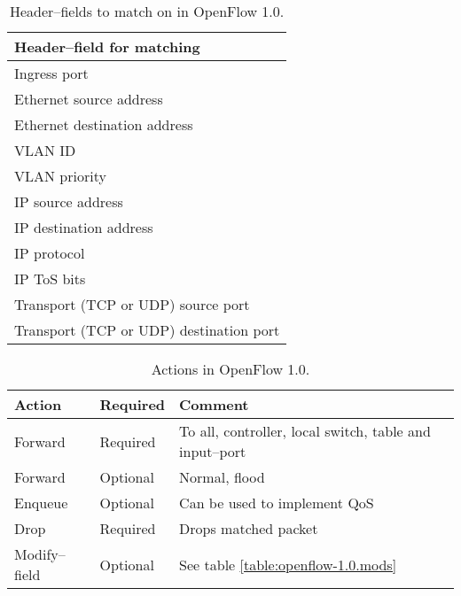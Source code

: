 \begin{table}
\centering
  \begin{tabular}{|l|}
    \hline \textbf{Header--field for matching} \\
    \hline Ingress port \\
    \hline Ethernet source address \\
    \hline Ethernet destination address \\
    \hline VLAN ID \\
    \hline VLAN priority \\
    \hline IP source address \\
    \hline IP destination address \\
    \hline IP protocol \\
    \hline IP \ac{ToS} bits \\
    \hline Transport (TCP or UDP) source port \\
    \hline Transport (TCP or UDP) destination port \\
    \hline
  \end{tabular}
  \caption{Header--fields to match on in OpenFlow 1.0.}
  \label{table:openflow-1.0.headers}
\end{table}

\begin{table}
\centering
  \begin{tabular}{|l|l|l|}
    \hline \textbf{Action} &
           \textbf{Required} &
           \textbf{Comment} \\
    \hline Forward & Required & To all, controller, local switch, table and input--port \\
    \hline Forward & Optional & Normal, flood \\
    \hline Enqueue & Optional &  Can be used to implement \ac{QoS} \\
    \hline Drop    & Required &  Drops matched packet \\
    \hline Modify--field & Optional &  See table \ref{table:openflow-1.0.mods} \\
    \hline
  \end{tabular}
  \caption{Actions in OpenFlow 1.0.}
  \label{table:openflow-1.0.actions}
\end{table}

